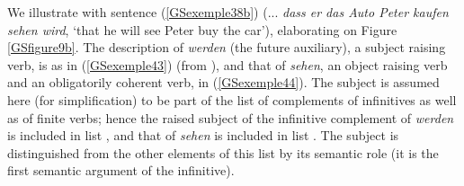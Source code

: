 \documentclass[output=paper]{langsci/langscibook}
\begin{document}
{\begin{exe}
\end{exe}

We illustrate with sentence (\ref{GSexemple38b}) (... \textit{dass er das Auto Peter kaufen sehen wird}, `that he will see Peter buy the car’), elaborating on Figure \ref{GSfigure9b}. The description of \textit{werden} (the future auxiliary), a subject raising verb, is as in (\ref{GSexemple43}) (from \citealt{muller2018clause}), and that of \textit{sehen}, an object raising verb and an obligatorily coherent verb, in (\ref{GSexemple44}). The subject is assumed here (for simplification) to be part of the list of complements of infinitives as well as of finite verbs; hence the raised subject of the infinitive complement of \textit{werden} is included in list , and that of \textit{sehen} is included in list . The subject is distinguished from the other elements of this list by its semantic role (it is the first semantic argument of the infinitive).     

\begin{exe}
    \label{GSexemple43}
\end{exe}

\begin{exe}
    \label{GSexemple44}
\end{exe}

}
\end{document}
